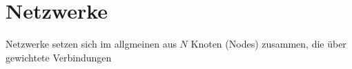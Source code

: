 
\section{Netzwerke}
Netzwerke setzen sich im allgmeinen aus $N$ Knoten (Nodes) zusammen, die über gewichtete Verbindungen 
\cite{pecora2014}
\cite{sagenotebook}
\cite{nauty}
\cite{pecora1998}